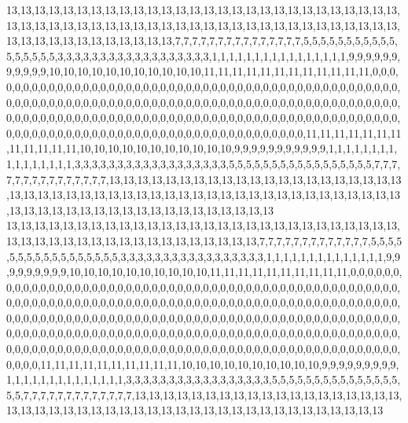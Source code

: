 13,13,13,13,13,13,13,13,13,13,13,13,13,13,13,13,13,13,13,13,13,13,13,13,13,13,13,13,13,13,13,13,13,13,13,13,13,13,13,13,13,13,13,13,13,13,13,13,13,13,13,13,13,13,13,13,13,13,13,13,13,13,13,13,13,13,13,13,7,7,7,7,7,7,7,7,7,7,7,7,7,7,7,5,5,5,5,5,5,5,5,5,5,5,5,5,5,5,5,5,3,3,3,3,3,3,3,3,3,3,3,3,3,3,3,3,3,3,1,1,1,1,1,1,1,1,1,1,1,1,1,1,1,1,9,9,9,9,9,9,9,9,9,9,9,10,10,10,10,10,10,10,10,10,10,10,11,11,11,11,11,11,11,11,11,11,11,11,0,0,0,0,0,0,0,0,0,0,0,0,0,0,0,0,0,0,0,0,0,0,0,0,0,0,0,0,0,0,0,0,0,0,0,0,0,0,0,0,0,0,0,0,0,0,0,0,0,0,0,0,0,0,0,0,0,0,0,0,0,0,0,0,0,0,0,0,0,0,0,0,0,0,0,0,0,0,0,0,0,0,0,0,0,0,0,0,0,0,0,0,0,0,0,0,0,0,0,0,0,0,0,0,0,0,0,0,0,0,0,0,0,0,0,0,0,0,0,0,0,0,0,0,0,0,0,0,0,0,0,0,0,0,0,0,0,0,0,0,0,0,0,0,0,0,0,0,0,0,0,0,0,0,0,0,0,0,0,0,0,0,0,0,0,0,0,0,0,0,0,0,0,0,0,0,11,11,11,11,11,11,11,11,11,11,11,11,10,10,10,10,10,10,10,10,10,10,10,9,9,9,9,9,9,9,9,9,9,9,1,1,1,1,1,1,1,1,1,1,1,1,1,1,1,1,3,3,3,3,3,3,3,3,3,3,3,3,3,3,3,3,3,3,5,5,5,5,5,5,5,5,5,5,5,5,5,5,5,5,5,7,7,7,7,7,7,7,7,7,7,7,7,7,7,7,13,13,13,13,13,13,13,13,13,13,13,13,13,13,13,13,13,13,13,13,13,13,13,13,13,13,13,13,13,13,13,13,13,13,13,13,13,13,13,13,13,13,13,13,13,13,13,13,13,13,13,13,13,13,13,13,13,13,13,13,13,13,13,13,13,13,13,13
13,13,13,13,13,13,13,13,13,13,13,13,13,13,13,13,13,13,13,13,13,13,13,13,13,13,13,13,13,13,13,13,13,13,13,13,13,13,13,13,13,13,13,13,13,13,7,7,7,7,7,7,7,7,7,7,7,7,7,5,5,5,5,5,5,5,5,5,5,5,5,5,5,5,5,5,3,3,3,3,3,3,3,3,3,3,3,3,3,3,3,3,3,1,1,1,1,1,1,1,1,1,1,1,1,1,1,9,9,9,9,9,9,9,9,9,10,10,10,10,10,10,10,10,10,10,11,11,11,11,11,11,11,11,11,11,0,0,0,0,0,0,0,0,0,0,0,0,0,0,0,0,0,0,0,0,0,0,0,0,0,0,0,0,0,0,0,0,0,0,0,0,0,0,0,0,0,0,0,0,0,0,0,0,0,0,0,0,0,0,0,0,0,0,0,0,0,0,0,0,0,0,0,0,0,0,0,0,0,0,0,0,0,0,0,0,0,0,0,0,0,0,0,0,0,0,0,0,0,0,0,0,0,0,0,0,0,0,0,0,0,0,0,0,0,0,0,0,0,0,0,0,0,0,0,0,0,0,0,0,0,0,0,0,0,0,0,0,0,0,0,0,0,0,0,0,0,0,0,0,0,0,0,0,0,0,0,0,0,0,0,0,0,0,0,0,0,0,0,0,0,0,0,0,0,0,0,0,0,0,0,0,0,0,0,0,0,0,0,0,0,0,0,0,0,0,0,0,0,0,0,0,0,0,0,0,0,0,0,0,0,0,0,0,0,0,0,0,0,0,0,0,0,0,0,0,0,0,0,0,0,0,0,0,0,0,0,0,0,0,0,0,0,0,0,0,11,11,11,11,11,11,11,11,11,11,10,10,10,10,10,10,10,10,10,10,9,9,9,9,9,9,9,9,9,1,1,1,1,1,1,1,1,1,1,1,1,1,1,3,3,3,3,3,3,3,3,3,3,3,3,3,3,3,3,3,5,5,5,5,5,5,5,5,5,5,5,5,5,5,5,5,5,7,7,7,7,7,7,7,7,7,7,7,7,7,13,13,13,13,13,13,13,13,13,13,13,13,13,13,13,13,13,13,13,13,13,13,13,13,13,13,13,13,13,13,13,13,13,13,13,13,13,13,13,13,13,13,13,13,13,13
